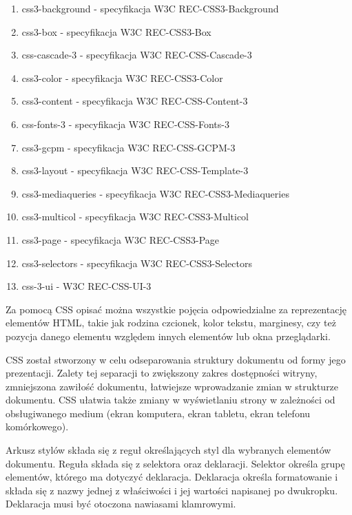 \documentclass[polish, twoside, 12pt]{mwart}
\begin{document}
\begin{enumerate}
  \item css3-background - specyfikacja W3C REC-CSS3-Background \cite{w3c-rec-css3-background}
  \item css3-box - specyfikacja W3C REC-CSS3-Box \cite{w3c-rec-css3-box}
  \item css-cascade-3 - specyfikacja W3C REC-CSS-Cascade-3 \cite{w3c-rec-css3-cascade}
  \item css3-color - specyfikacja W3C REC-CSS3-Color \cite{w3c-rec-css3-color}
  \item css3-content - specyfikacja W3C REC-CSS-Content-3 \cite{w3c-rec-css3-content}
  \item css-fonts-3 - specyfikacja W3C REC-CSS-Fonts-3 \cite{w3c-rec-css3-fonts}
  \item css3-gcpm - specyfikacja W3C REC-CSS-GCPM-3 \cite{w3c-rec-css3-gcpm}
  \item css3-layout - specyfikacja W3C REC-CSS-Template-3 \cite{w3c-rec-css3-template}
  \item css3-mediaqueries - specyfikacja W3C REC-CSS3-Mediaqueries \cite{w3c-rec-css3-mediaqueries}
  \item css3-multicol - specyfikacja W3C REC-CSS3-Multicol \cite{w3c-rec-css3-multicol}
  \item css3-page - specyfikacja W3C REC-CSS3-Page \cite{w3c-rec-css3-page}
  \item css3-selectors - specyfikacja W3C REC-CSS3-Selectors \cite{w3c-rec-css3-selectors}
  \item css-3-ui - W3C REC-CSS-UI-3 \cite{w3c-rec-css3-ui}
\end{enumerate}

Za pomocą CSS opisać można wszystkie pojęcia odpowiedzialne za reprezentację elementów HTML, takie jak rodzina czcionek, kolor tekstu, marginesy, czy też pozycja danego elementu względem innych elementów lub okna przeglądarki.

CSS został stworzony w celu odseparowania struktury dokumentu od formy jego prezentacji. Zalety tej separacji to zwiększony zakres dostępności witryny, zmniejszona zawiłość dokumentu, łatwiejsze wprowadzanie zmian w strukturze dokumentu. CSS ułatwia także zmiany w wyświetlaniu strony w zależności od obsługiwanego medium (ekran komputera, ekran tabletu, ekran telefonu komórkowego).

Arkusz stylów składa się z reguł określających styl dla wybranych elementów dokumentu. Reguła składa się z selektora oraz deklaracji. Selektor określa grupę elementów, którego ma dotyczyć deklaracja. Deklaracja określa formatowanie i składa się z nazwy jednej z właściwości i jej wartości napisanej po dwukropku. Deklaracja musi być otoczona nawiasami klamrowymi.
\end{document}
